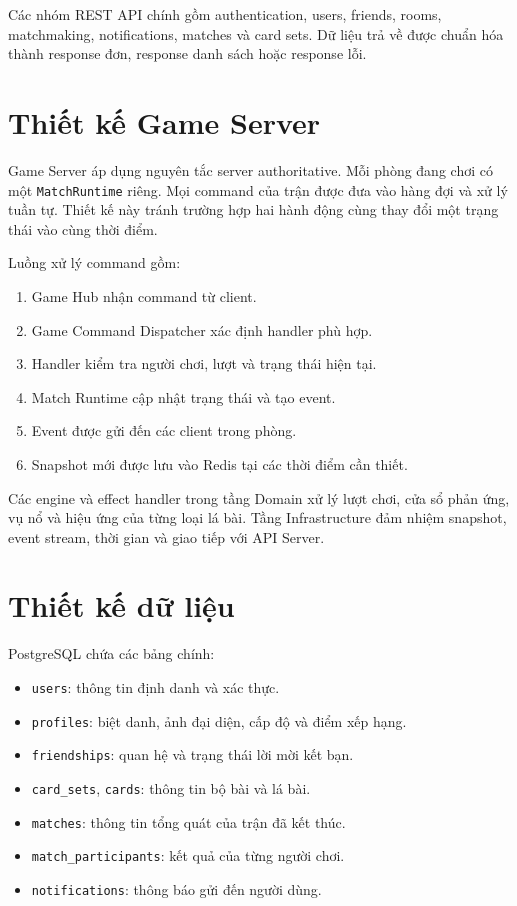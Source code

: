 \documentclass[a4paper]{report}
\begin{document}
Các nhóm REST API chính gồm authentication, users, friends, rooms, matchmaking,
notifications, matches và card sets. Dữ liệu trả về được chuẩn hóa thành response
đơn, response danh sách hoặc response lỗi.

\section{Thiết kế Game Server}

Game Server áp dụng nguyên tắc server authoritative. Mỗi phòng đang chơi có một
\texttt{MatchRuntime} riêng. Mọi command của trận được đưa vào hàng đợi và xử lý
tuần tự. Thiết kế này tránh trường hợp hai hành động cùng thay đổi một trạng thái
vào cùng thời điểm.

Luồng xử lý command gồm:

\begin{enumerate}
    \item Game Hub nhận command từ client.
    \item Game Command Dispatcher xác định handler phù hợp.
    \item Handler kiểm tra người chơi, lượt và trạng thái hiện tại.
    \item Match Runtime cập nhật trạng thái và tạo event.
    \item Event được gửi đến các client trong phòng.
    \item Snapshot mới được lưu vào Redis tại các thời điểm cần thiết.
\end{enumerate}

Các engine và effect handler trong tầng Domain xử lý lượt chơi, cửa sổ phản ứng,
vụ nổ và hiệu ứng của từng loại lá bài. Tầng Infrastructure đảm nhiệm snapshot,
event stream, thời gian và giao tiếp với API Server.

\section{Thiết kế dữ liệu}

PostgreSQL chứa các bảng chính:

\begin{itemize}
    \item \texttt{users}: thông tin định danh và xác thực.
    \item \texttt{profiles}: biệt danh, ảnh đại diện, cấp độ và điểm xếp hạng.
    \item \texttt{friendships}: quan hệ và trạng thái lời mời kết bạn.
    \item \texttt{card\_sets}, \texttt{cards}: thông tin bộ bài và lá bài.
    \item \texttt{matches}: thông tin tổng quát của trận đã kết thúc.
    \item \texttt{match\_participants}: kết quả của từng người chơi.
    \item \texttt{notifications}: thông báo gửi đến người dùng.
\end{itemize}
\end{document}
